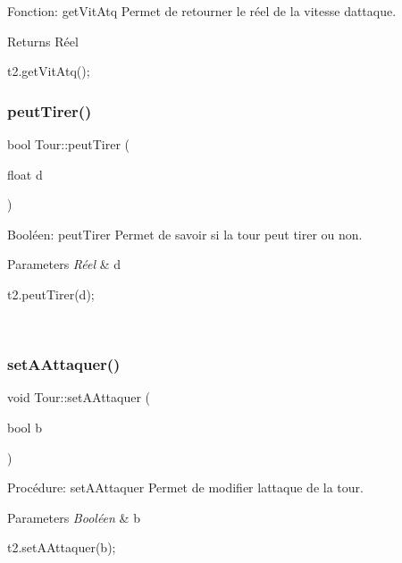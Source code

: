 Fonction\+: get\+Vit\+Atq Permet de retourner le réel de la vitesse d\textquotesingle{}attaque. 

\begin{DoxyReturn}{Returns}
Réel 
\begin{DoxyCode}
t2.getVitAtq();
\end{DoxyCode}
 
\end{DoxyReturn}
\mbox{\label{classTour_ad5f5b265668dfa44b23e48a1dbf1e322}} 
\subsubsection{\texorpdfstring{peut\+Tirer()}{peutTirer()}}
{\footnotesize\ttfamily bool Tour\+::peut\+Tirer (\begin{DoxyParamCaption}\item[{float}]{d }\end{DoxyParamCaption})}



Booléen\+: peut\+Tirer Permet de savoir si la tour peut tirer ou non. 


\begin{DoxyParams}{Parameters}
{\em Réel} & d 
\begin{DoxyCode}
t2.peutTirer(d);
\end{DoxyCode}
 \\
\hline
\end{DoxyParams}
\mbox{\label{classTour_a045dac5adb162b2b5089507b445edae6}} 
\subsubsection{\texorpdfstring{set\+A\+Attaquer()}{setAAttaquer()}}
{\footnotesize\ttfamily void Tour\+::set\+A\+Attaquer (\begin{DoxyParamCaption}\item[{bool}]{b }\end{DoxyParamCaption})}



Procédure\+: set\+A\+Attaquer Permet de modifier l\textquotesingle{}attaque de la tour. 


\begin{DoxyParams}{Parameters}
{\em Booléen} & b 
\begin{DoxyCode}
t2.setAAttaquer(b);
\end{DoxyCode}
 \\
\hline
\end{DoxyParams}
\mbox{\label{classTour_a7f9a17a8138ebd8afe72520d7d8a18db}} 
